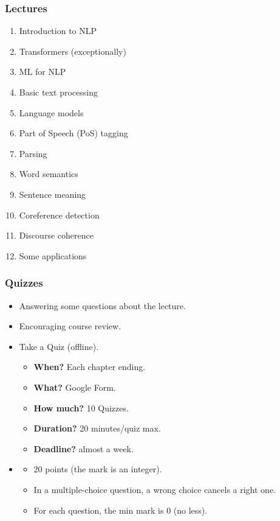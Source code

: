 \documentclass{beamer}
\begin{document}
\begin{frame}
\frametitle{Lectures}

\begin{enumerate}
	\item Introduction to NLP
	\item {\color{red}Transformers (exceptionally)}
	\item ML for NLP
	\item Basic text processing
	\item Language models
	\item Part of Speech (PoS) tagging
	\item Parsing
	\item Word semantics
	\item Sentence meaning
	\item Coreference detection
	\item Discourse coherence
	\item Some applications
\end{enumerate}

\end{frame}

\begin{frame}
	\frametitle{Quizzes}
	
	\begin{itemize}
		\item Answering some questions about the lecture.
		\item {} Encouraging course review.
		\item {} Take a Quiz (offline).
		\begin{itemize}
			\item \textbf{When?} Each chapter ending.
			\item \textbf{What?} Google Form.
			\item \textbf{How much?} 10 Quizzes.
			\item \textbf{Duration?} 20 minutes/quiz max.
			\item \textbf{Deadline?} almost a week.
		\end{itemize}
		\item {}
		\begin{itemize}
			\item 20 points (the mark is an integer).
			\item In a multiple-choice question, a wrong choice cancels a right one.
			\item For each question, the min mark is 0 (no less).
		\end{itemize}
	\end{itemize}
	
\end{frame}
\end{document}
